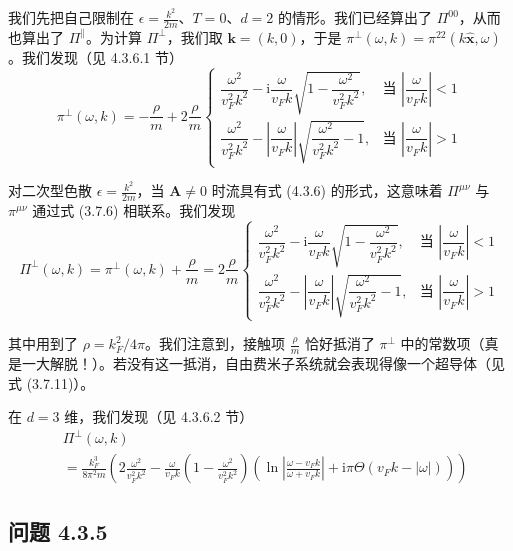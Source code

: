 我们先把自己限制在 $\epsilon=\frac{k^2}{2m}$、$T=0$、$d=2$ 的情形。我们已经算出了 $\Pi^{00}$，从而也算出了 $\Pi^{\parallel}$。为计算 $\Pi^{\perp}$，我们取 $\pmb{k}=(k,0)$，于是 $\pi^{\perp}(\omega,k)=\pi^{22}(k\hat{\pmb{x}},\omega)$。我们发现（见 4.3.6.1 节）
\begin{equation*}
\pi^{\perp}(\omega,k) = -\frac{\rho}{m} + 2\frac{\rho}{m}
\left\{
\begin{array}{ll}
\dfrac{\omega^2}{v_F^2k^2} - \mathrm{i}\dfrac{\omega}{v_F k}\sqrt{1-\dfrac{\omega^2}{v_F^2k^2}}, & \text{当 } \left|\dfrac{\omega}{v_F k}\right|<1\\[4ex]
\dfrac{\omega^2}{v_F^2k^2} - \left|\dfrac{\omega}{v_F k}\right|\sqrt{\dfrac{\omega^2}{v_F^2k^2}-1}, & \text{当 } \left|\dfrac{\omega}{v_F k}\right|>1
\end{array}
\right.
\end{equation*}

对二次型色散 $\epsilon=\frac{k^2}{2m}$，当 $\pmb{A}\neq 0$ 时流具有式 (4.3.6) 的形式，这意味着 $\Pi^{\mu\nu}$ 与 $\pi^{\mu\nu}$ 通过式 (3.7.6) 相联系。我们发现
\begin{equation*}
\Pi^{\perp}(\omega,k) = \pi^{\perp}(\omega,k) + \frac{\rho}{m} = 2\frac{\rho}{m}
\left\{
\begin{array}{ll}
\dfrac{\omega^2}{v_F^2k^2} - \mathrm{i}\dfrac{\omega}{v_F k}\sqrt{1-\dfrac{\omega^2}{v_F^2k^2}}, & \text{当 } \left|\dfrac{\omega}{v_F k}\right|<1\\[4ex]
\dfrac{\omega^2}{v_F^2k^2} - \left|\dfrac{\omega}{v_F k}\right|\sqrt{\dfrac{\omega^2}{v_F^2k^2}-1}, & \text{当 } \left|\dfrac{\omega}{v_F k}\right|>1
\end{array}
\right. \tag{4.3.10}
\end{equation*}

其中用到了 $\rho=k_F^2/4\pi$。我们注意到，接触项 $\frac{\rho}{m}$ 恰好抵消了 $\pi^{\perp}$ 中的常数项（真是一大解脱！）。若没有这一抵消，自由费米子系统就会表现得像一个超导体（见式 (3.7.11)）。

在 $d=3$ 维，我们发现（见 4.3.6.2 节）
\begin{align*}
&\Pi^{\perp}(\omega,k) \tag{4.3.11}\\
&= \frac{k_F^3}{8\pi^2 m}\left(2\frac{\omega^2}{v_F^2k^2} - \frac{\omega}{v_F k}\left(1-\frac{\omega^2}{v_F^2k^2}\right)\left(\ln\left|\frac{\omega-v_F k}{\omega+v_F k}\right| + \mathrm{i}\pi\Theta(v_F k-|\omega|)\right)\right)
\end{align*}

\subsection*{问题 4.3.5}

